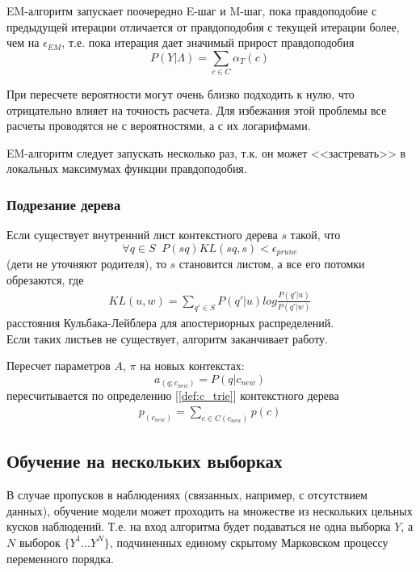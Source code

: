 \documentclass{matmex-diploma-custom}
\begin{document}
EM-алгоритм запускает поочередно E-шаг и M-шаг, пока правдоподобие с предыдущей итерации отличается от правдоподобия с текущей итерации более, чем на $ \epsilon_{\textit{EM}}$, т.е. пока итерация дает значимый прирост правдоподобия
$$P(Y| \Lambda) = \sum_{c \in C}\alpha_{T}(c)$$

\begin{remark} При пересчете вероятности могут очень близко подходить к нулю, что отрицательно влияет на точность расчета. Для избежания этой проблемы все расчеты проводятся не с вероятностями, а с их логарифмами.
\end{remark}

\begin{remark} EM-алгоритм следует запускать несколько раз, т.к. он может <<застревать>> в локальных максимумах функции правдоподобия.
\end{remark}

\subsubsection{Подрезание дерева} 
Если существует внутренний лист контекстного дерева $ s $ такой, что 
$$ \forall q \in S \;\; P(sq)\textit{KL}(sq, s) < \epsilon_{\textit{prune}} $$
(дети не уточняют родителя), то $ s $ становится листом, а все его потомки обрезаются, где
\begin{align*}
\textit{KL}(u, w) = \sum_{q' \in S} P(q'|u) log\frac{P(q'|u)}{P(q'|w)}
\end{align*}
расстояния Кульбака-Лейблера для апостериорных распределений.
\\Если таких листьев не существует, алгоритм заканчивает работу.

Пересчет параметров $ A $, $\pi$ на новых контекстах:
$$a_(q; c_{\textit{new}}) = P(q| c_{\textit{new}})$$
пересчитывается по определению [\ref{def:c_trie}] контекстного дерева
\begin{align*}
p_(c_{\textit{new}}) = \sum_{c \in C(c_{\textit{new}})}{p(c)}
\end{align*}


\subsection{Обучение на нескольких выборках}
В случае пропусков в наблюдениях (связанных, например, с отсутствием данных), обучение модели может проходить на множестве из нескольких цельных кусков наблюдений.
Т.е. на вход алгоритма будет подаваться не одна выборка $Y$, а                                                                                                                                                                                                                                                                                                                                                                                                                                                                                                                                                                                                                                                              $ N $ выборок $ \{Y^{1} \ldots Y^{N}\}$, подчиненных единому скрытому Марковском процессу переменного порядка.
\end{document}
